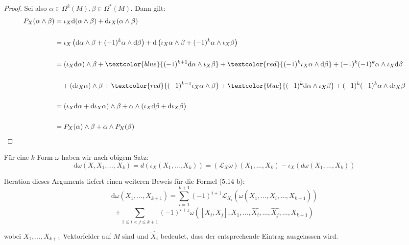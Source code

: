 \documentclass[fleqn, 12pt, letterpaper]{article}
\begin{document}
\begin{proof}
Sei also \( \alpha \in \Omega^k(M), \beta \in \Omega^*(M) \). Dann gilt:
\begin{align*}
P_X(\alpha \wedge \beta) 
&= \iota_X \mathrm{d}(\alpha \wedge \beta) + \mathrm{d} \iota_X(\alpha \wedge \beta) \\\\
&= \iota_X \left( \mathrm{d}\alpha \wedge \beta + (-1)^k \alpha \wedge \mathrm{d}\beta \right)
  + \mathrm{d} \left( \iota_X \alpha \wedge \beta + (-1)^k \alpha \wedge \iota_X \beta \right) \\\\
&= (\iota_X \mathrm{d}\alpha )\wedge \beta + \textcolor{blue}{(-1)^{k+1} \mathrm{d}\alpha \wedge \iota_X \beta} 
  + \textcolor{red}{(-1)^k \iota_X \alpha \wedge \mathrm{d}\beta} +(-1)^k(-1)^k\alpha\wedge\iota_X \mathrm{d}\beta\\\\
&\quad + (\mathrm{d} \iota_X \alpha)  \wedge \beta + \textcolor{red}{(-1)^{k-1}\iota_X\alpha \wedge \beta} + \textcolor{blue}{(-1)^k \mathrm{d}\alpha \wedge \iota_X \beta }
  + (-1)^k(-1)^k \alpha \wedge \mathrm{d} \iota_X \beta \\\\
&= (\iota_X \mathrm{d}\alpha + \mathrm{d} \iota_X \alpha) \wedge \beta 
  + \alpha \wedge (\iota_X \mathrm{d}\beta + \mathrm{d} \iota_X \beta) \\\\
&= P_X(\alpha) \wedge \beta + \alpha \wedge P_X(\beta)
\end{align*}
\end{proof}

Für eine \( k \)-Form \( \omega \) haben wir nach obigem Satz:
\[
\mathrm{d} \omega(X, X_1, \dots, X_k) = d(\iota_X(X_1,\dots,X_k))= (\mathcal{L}_X\omega)(X_1, \dots, X_k)-\iota_X(d\omega(X_1, \dots, X_k))
\]

{Iteration dieses Arguments liefert einen weiteren Beweis für die Formel (5.14 b):}
\[
\mathrm{d}\omega(X_1, \dots, X_{k+1}) =
\sum_{i=1}^{k+1} (-1)^{i+1} \mathcal{L}_{X_i} \left( \omega(X_1, \dots, \widehat{X_i}, \dots, X_{k+1}) \right)
\]
\[+ \sum_{1 \le i < j \le k+1} (-1)^{i+j} \omega([X_i, X_j], X_1, \dots, \widehat{X_i}, \dots, \widehat{X_j}, \dots, X_{k+1})\]

wobei \( X_1, \dots, X_{k+1} \) Vektorfelder auf \( M \) sind und \( \widehat{X_i} \) bedeutet, dass der entsprechende Eintrag ausgelassen wird.\\
\end{document}
